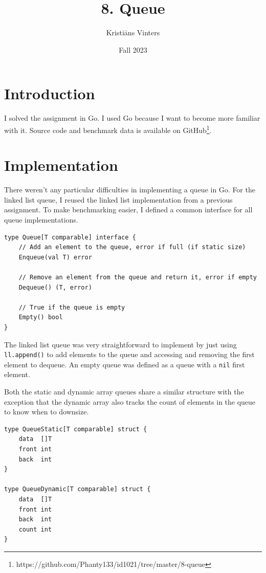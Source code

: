 \documentclass[a4paper,11pt]{article}
\title{\textbf{8. Queue}}
\author{Kristiāns Vinters}
\date{Fall 2023}
\begin{document}
    \maketitle
    \section*{Introduction}

    I solved the assignment in Go. I used Go because I want to become more familiar with it. Source code and benchmark data is available on GitHub\footnote[1]{https://github.com/Phanty133/id1021/tree/master/8-queue}.

    \section*{Implementation}

    There weren't any particular difficulties in implementing a queue in Go. For the linked list queue, I reused the linked list implementation from a previous assignment. To make benchmarking easier, I defined a common interface for all queue implementations.

    \begin{verbatim}
type Queue[T comparable] interface {
    // Add an element to the queue, error if full (if static size)
    Enqueue(val T) error

    // Remove an element from the queue and return it, error if empty
    Dequeue() (T, error)

    // True if the queue is empty
    Empty() bool
}
    \end{verbatim}

    The linked list queue was very straightforward to implement by just using \texttt{ll.append()} to add elements to the queue and accessing and removing the first element to dequeue. An empty queue was defined as a queue with a \texttt{nil} first element.

    Both the static and dynamic array queues share a similar structure with the exception that the dynamic array also tracks the count of elements in the queue to know when to downsize.

    \begin{verbatim}
type QueueStatic[T comparable] struct {
    data  []T
    front int
    back  int
}

type QueueDynamic[T comparable] struct {
    data  []T
    front int
    back  int
    count int
}
    \end{verbatim}
\end{document}
